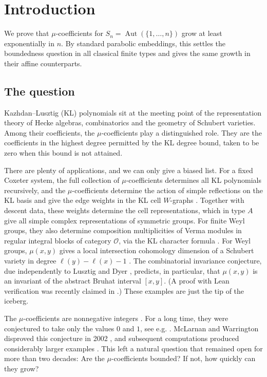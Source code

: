 \documentclass[a4paper,11pt]{amsart}
\numberwithin{equation}{subsection}
\theoremstyle{plain}
\theoremstyle{definition}
\theoremstyle{remark}
\begin{document}
\section{Introduction}

We prove that $\mu$-coefficients for
$S_n=\operatorname{Aut}(\{1,\ldots,n\})$ grow at least
exponentially in $n$. By standard parabolic embeddings, this settles the boundedness question in all classical finite types and gives the same growth in their affine counterparts.

\subsection{The question}

Kazhdan--Lusztig (KL) polynomials \cite{KL} sit at the meeting point
of the representation theory of Hecke algebras, combinatorics and
the geometry of Schubert varieties. Among their coefficients,
the $\mu$-coefficients play a distinguished role. They are the
coefficients in the highest degree permitted by the KL degree
bound, taken to be zero when this bound is not attained.

\begin{remark}
There are plenty of applications, and we can only give a biased list.
For a fixed Coxeter system, the full collection of $\mu$-coefficients determines all KL polynomials recursively,
and the $\mu$-coefficients determine the action of simple reflections on the KL basis and 
give the edge weights in the KL cell
$W$-graphs \cite{KL}. Together with descent data, these weights
determine the cell representations, which in type $A$ give all
simple complex representations of symmetric groups.
For finite Weyl groups, they also determine composition
multiplicities of Verma modules in regular integral blocks of
category $\mathcal O$, via the KL character formula \cite{KL}.
For Weyl groups, $\mu(x,y)$ gives a local intersection cohomology
dimension of a Schubert variety in degree $\ell(y)-\ell(x)-1$
\cite{KLPositivity}.
The combinatorial invariance conjecture, due independently to
Lusztig and Dyer \cite{Dyer}, predicts, in particular, that
$\mu(x,y)$ is an invariant of the abstract Bruhat interval $[x,y]$.
(A proof with Lean verification was recently claimed in
\cite{OpenAICIC}.)
These examples are just the tip of the iceberg.
\end{remark}

The $\mu$-coefficients are nonnegative integers \cite{KLPositivity}.
For a long time, they were conjectured to take only the values
$0$ and $1$, see e.g. \cite{LS,GarsiaMcLarnan}. McLarnan and Warrington disproved this conjecture
in 2002 \cite{MW}, and subsequent computations produced
considerably larger examples \cite{Warrington}.
This left a natural question that remained open for more
than two decades: Are the $\mu$-coefficients bounded? If not, how quickly can they grow?
\end{document}
